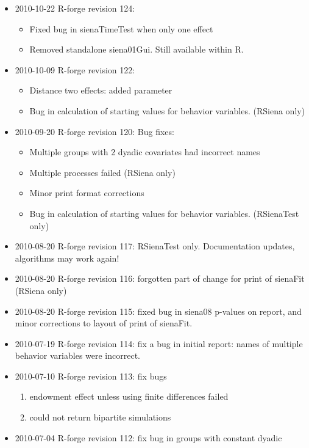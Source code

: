 \documentclass[a4paper,fleqn,11pt]{article}
\newcommand{\+}{\, + \,}
\newcommand{\Rn}{{\sf R}}
\begin{document}
{\begin{small}
\begin{itemize}
\begin{itemize}
  defined interactions, multiple dependent networks and multiple groups.
\end{itemize}
\item 2010-10-22 R-forge revision 124:
\begin{itemize}
\item Fixed bug in sienaTimeTest when only one effect
\item Removed standalone siena01Gui. Still available within \Rn.
\end{itemize}
\item 2010-10-09 R-forge revision 122:
\begin{itemize}
\item Distance two effects: added parameter
\item Bug in calculation of starting values for behavior variables.
(RSiena only)
\end{itemize}
\item 2010-09-20 R-forge revision 120: Bug fixes:
\begin{itemize}
\item Multiple groups with 2 dyadic covariates had incorrect names
\item Multiple processes failed (RSiena only)
\item Minor print format corrections
\item Bug in calculation of starting values for behavior variables.
(RSienaTest only)
\end{itemize}
\item 2010-08-20 R-forge revision 117: RSienaTest only. Documentation updates,
algorithms may work again!
\item 2010-08-20 R-forge revision 116: forgotten
part of change for print of sienaFit (RSiena only)
\item 2010-08-20 R-forge revision 115: fixed bug in siena08 p-values on report,
and minor corrections to layout of print of sienaFit.
\item 2010-07-19 R-forge revision 114: fix a bug in initial report: names of
  multiple behavior variables were incorrect.
\item 2010-07-10 R-forge revision 113: fix bugs
\begin{enumerate}
\item endowment effect unless using finite differences failed
\item could not return bipartite simulations
\end{enumerate}
\item 2010-07-04 R-forge revision 112: fix bug in groups with constant dyadic

\end{itemize}
\end{small}}
\end{document}
